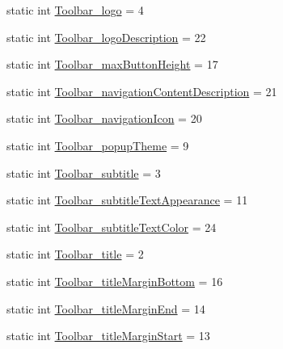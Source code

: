 \begin{DoxyCompactItemize}
\item 
static int \hyperlink{classandroid_1_1support_1_1v7_1_1mediarouter_1_1R_1_1styleable_ab965f1cf2cb8e80419699e46c728bc5e}{Toolbar\+\_\+logo} = 4
\item 
static int \hyperlink{classandroid_1_1support_1_1v7_1_1mediarouter_1_1R_1_1styleable_aa07c1902f3672989051d9bdae17e9fae}{Toolbar\+\_\+logo\+Description} = 22
\item 
static int \hyperlink{classandroid_1_1support_1_1v7_1_1mediarouter_1_1R_1_1styleable_a4ca61dab98fe3ca8b16448d7177099ae}{Toolbar\+\_\+max\+Button\+Height} = 17
\item 
static int \hyperlink{classandroid_1_1support_1_1v7_1_1mediarouter_1_1R_1_1styleable_afe01241b2d5b5f87f898aa12e71cfa1c}{Toolbar\+\_\+navigation\+Content\+Description} = 21
\item 
static int \hyperlink{classandroid_1_1support_1_1v7_1_1mediarouter_1_1R_1_1styleable_a19bd33bd2c0ed2e7c65711493473a5f9}{Toolbar\+\_\+navigation\+Icon} = 20
\item 
static int \hyperlink{classandroid_1_1support_1_1v7_1_1mediarouter_1_1R_1_1styleable_a48b8c2cdd2d740aa2c3750514fedfb2a}{Toolbar\+\_\+popup\+Theme} = 9
\item 
static int \hyperlink{classandroid_1_1support_1_1v7_1_1mediarouter_1_1R_1_1styleable_a2d7c64e1a6cb4a3235e4193b4b60aab0}{Toolbar\+\_\+subtitle} = 3
\item 
static int \hyperlink{classandroid_1_1support_1_1v7_1_1mediarouter_1_1R_1_1styleable_ae7bd2ce11528308b118b298fe49859a8}{Toolbar\+\_\+subtitle\+Text\+Appearance} = 11
\item 
static int \hyperlink{classandroid_1_1support_1_1v7_1_1mediarouter_1_1R_1_1styleable_a22de0afbca4455a806f9f117c354cd60}{Toolbar\+\_\+subtitle\+Text\+Color} = 24
\item 
static int \hyperlink{classandroid_1_1support_1_1v7_1_1mediarouter_1_1R_1_1styleable_a05ec1e28754fbfa9f733ca3620654664}{Toolbar\+\_\+title} = 2
\item 
static int \hyperlink{classandroid_1_1support_1_1v7_1_1mediarouter_1_1R_1_1styleable_a1f5dbc575e0bcf37c09dd7506d9b2bcc}{Toolbar\+\_\+title\+Margin\+Bottom} = 16
\item 
static int \hyperlink{classandroid_1_1support_1_1v7_1_1mediarouter_1_1R_1_1styleable_a5591b917ffe94c9777044faf432a7a7d}{Toolbar\+\_\+title\+Margin\+End} = 14
\item 
static int \hyperlink{classandroid_1_1support_1_1v7_1_1mediarouter_1_1R_1_1styleable_a3bb137bbd841404139f825faa9bdacb6}{Toolbar\+\_\+title\+Margin\+Start} = 13

\end{DoxyCompactItemize}
